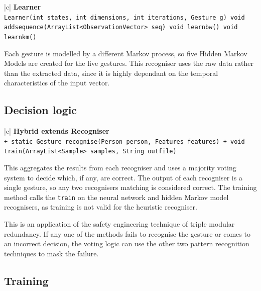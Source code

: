 \documentclass[12pt,a4,notitlepage]{report}
\renewcommand{\_}{\texttt{\symbol{95}}}
\newcommand{\<}{\texttt{\symbol{60}}}
\renewcommand{\>}{\texttt{\symbol{62}}}
\newcommand{\class}[1]{\textbf{#1}}
\newcommand{\variable}[1]{\texttt{#1}}
\begin{document}
\begin{tabular}{|c|} \hline 
\class{Learner} \\ \hline
{}
{ \variable{Learner(int states, int dimensions, int iterations, Gesture g) \newline
void add\_sequence(ArrayList<ObservationVector> seq) \newline
void learnbw() \newline
void learnkm()
} } \\ \hline
\end{tabular}


Each gesture is modelled by a different Markov process, so five Hidden Markov Models are created for the five gestures. This recogniser uses the raw data rather than the extracted data, since it is highly dependant on the temporal characteristics of the input vector.

\newpage

\subsection{Decision logic}

\begin{tabular}{|c|} \hline 
\class{Hybrid extends Recogniser} \\ \hline
{}
{ \variable{+ static Gesture recognise(Person person, Features features) \newline
+ void train(ArrayList<Sample> samples, String out\_file)
} } \\ \hline
\end{tabular}

This aggregates the results from each recogniser and uses a majority voting system to decide which, if any, are correct. The output of each recogniser is a single gesture, so any two recognisers matching is considered correct. The training method calls the \variable{train} on the neural network and hidden Markov model recognisers, as training is not valid for the heuristic recogniser.

This is an application of the safety engineering technique of triple modular redundancy. If any one of the methods fails to recognise the gesture or comes to an incorrect decision, the voting logic can use the other two pattern recognition techniques to mask the failure.

\subsection{Training}
\end{document}
